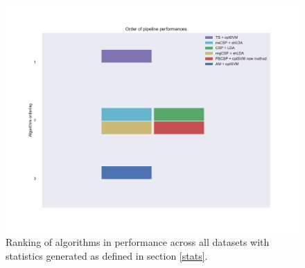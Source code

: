\begin{figure}
    \centering
    \includegraphics[width=\textwidth]{Figures/ordering.pdf}
    \caption{Ranking of algorithms in performance across all datasets with statistics generated as defined in section \ref{stats}.}
    \label{fig:all}
\end{figure}



